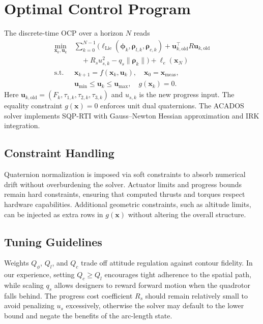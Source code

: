 \documentclass[letterpaper, 10pt, conference]{IEEEtran}
\begin{document}
\section{Optimal Control Program}
\label{sec:ocp}
The discrete-time OCP over a horizon $N$ reads
\begin{align}
    \min_{\mathbf{x}_k, \mathbf{u}_k} \ & \sum_{k=0}^{N-1} \Big( \ell_{\text{Lie}}(\bm{\phi}_k, \bm{\rho}_{l,k}, \bm{\rho}_{c,k}) + \mathbf{u}_{k,\text{old}}^\top R \mathbf{u}_{k,\text{old}} \\
    & \quad + R_s u_{s,k}^2 - q_s \|\bm{\rho}_k\| \Big) + \ell_e(\mathbf{x}_N) \nonumber \\
    \text{s.t. }\ & \mathbf{x}_{k+1} = f(\mathbf{x}_k, \mathbf{u}_k), \quad \mathbf{x}_0 = \mathbf{x}_\mathrm{meas}, \\
    & \mathbf{u}_{\min} \leq \mathbf{u}_k \leq \mathbf{u}_{\max}, \quad g(\mathbf{x}_k)=0.
\end{align}
Here $\mathbf{u}_{k,\text{old}} = (F_k, \tau_{1,k}, \tau_{2,k}, \tau_{3,k})$ and $u_{s,k}$ is the new progress input. The equality constraint $g(\mathbf{x})=0$ enforces unit dual quaternions. The ACADOS solver implements SQP-RTI with Gauss–Newton Hessian approximation and IRK integration.

\subsection{Constraint Handling}
Quaternion normalization is imposed via soft constraints to absorb numerical drift without overburdening the solver. Actuator limits and progress bounds remain hard constraints, ensuring that computed thrusts and torques respect hardware capabilities. Additional geometric constraints, such as altitude limits, can be injected as extra rows in $g(\mathbf{x})$ without altering the overall structure.

\subsection{Tuning Guidelines}
Weights $Q_\phi$, $Q_l$, and $Q_c$ trade off attitude regulation against contour fidelity. In our experience, setting $Q_c \geq Q_l$ encourages tight adherence to the spatial path, while scaling $q_s$ allows designers to reward forward motion when the quadrotor falls behind. The progress cost coefficient $R_s$ should remain relatively small to avoid penalizing $u_s$ excessively, otherwise the solver may default to the lower bound and negate the benefits of the arc-length state.
\end{document}
